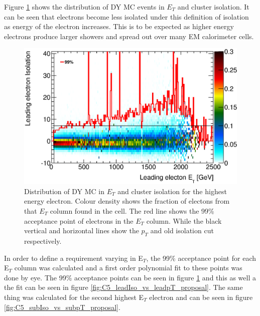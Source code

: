 Figure \ref{fig:C5_leadIso_vs_leadpT} shows the distribution of DY MC events in $E_{T}$ and cluster isolation. It can be seen that electrons become less isolated under this definition of isolation as energy of the electron increases. This is to be expected as higher energy electrons produce larger showers and spread out over many EM calorimeter cells. 

   \begin{figure}[h]
      \begin{center}
      \includegraphics[scale=0.7]{images/C5_leadIso_vs_leadpT.eps}
      \end{center}
   \caption{Distribution of DY MC in $E_{T}$ and cluster isolation for the highest energy electron. Colour density shows the fraction of electons from that $E_{T}$ column found in the cell. The red line shows the 99\% acceptance point of electrons in the $E_{T}$ column. While the black vertical and horizontal lines show the $p_{T}$ and old isolation cut respectively.}
   \label{fig:C5_leadIso_vs_leadpT}
   \end{figure}


In order to define a requirement varying in E$_{T}$, the 99\% acceptance point for each E$_{T}$ column was calculated and a first order polynomial fit to these points was done by eye. The 99\% acceptance points can be seen in figure \ref{fig:C5_leadIso_vs_leadpT} and this as well a the fit can be seen in figure \ref{fig:C5_leadIso_vs_leadpT_proposal}. The same thing was calculated for the second highest E$_{T}$ electron and can be seen in figure \ref{fig:C5_subIso_vs_subpT_proposal}.



